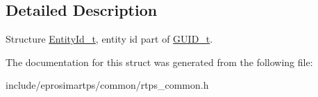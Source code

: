 \subsection{\-Detailed \-Description}
\-Structure \hyperlink{structeprosima_1_1rtps_1_1_entity_id__t}{\-Entity\-Id\-\_\-t}, entity id part of \hyperlink{structeprosima_1_1rtps_1_1_g_u_i_d__t}{\-G\-U\-I\-D\-\_\-t}. 

\-The documentation for this struct was generated from the following file\-:\begin{DoxyCompactItemize}
\item 
include/eprosimartps/common/rtps\-\_\-common.\-h\end{DoxyCompactItemize}
